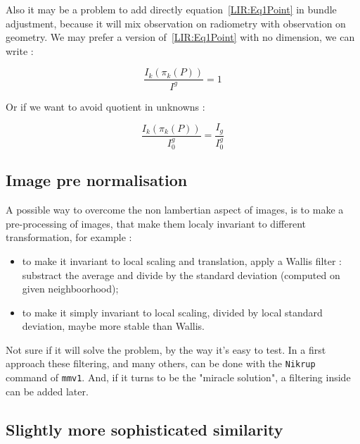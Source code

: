 Also it may be a problem to add directly equation~\ref{LIR:Eq1Point} in bundle
adjustment, because it will mix observation on radiometry with observation on
geometry.  We may prefer a version of~\ref{LIR:Eq1Point} with no dimension,
we can write :

\begin{equation}
    \frac{I_k(\pi_k(P))}{I^g} = 1
\end{equation}

Or if we want to avoid quotient in unknowns :

\begin{equation}
    \frac{I_k(\pi_k(P))}{I^g_0} = \frac{I_g}{I^g_0} 
\end{equation}


\subsection{Image pre normalisation}

A possible way to  overcome the non lambertian aspect of images,
is to make a pre-processing of images, that make them localy invariant
to different transformation, for example :

\begin{itemize}
    \item to make it invariant to local scaling and translation, apply a Wallis filter : substract the average and divide by the
          standard deviation (computed on given neighboorhood);

    \item   to make it simply invariant to local scaling,  divided by local standard deviation, maybe more stable than
            Wallis.
\end{itemize}

Not sure if it will solve the problem, by the way it's easy to test.  
In a first approach these filtering, and many others, can be done with
the {\tt Nikrup}  command of {\tt mmv1}. And, if it turns to be the  "miracle solution",
a  filtering inside \PPP can be added later.  





\subsection{Slightly more sophisticated similarity}

